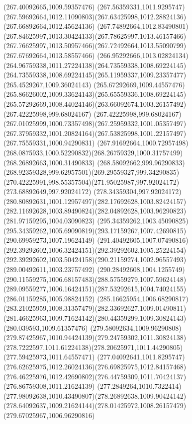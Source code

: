 {{\lineto(267.40092665,1009.59357476)
\lineto(267.56359331,1011.9295747)
\curveto(267.59692664,1012.11090803)(267.63425998,1012.28824136)(267.66892664,1012.45624136)
\curveto(267.74892664,1012.83490801)(267.84625997,1013.30424133)(267.78625997,1013.46157466)
\curveto(267.76625997,1013.50957466)(267.72492664,1013.55090799)(267.67692664,1013.58557466)
\curveto(266.95292666,1013.02824134)(264.96759338,1011.27224138)(264.73559338,1008.69224145)
\curveto(264.73559338,1008.69224145)(265.11959337,1009.23357477)(265.4529267,1009.36024143)
\curveto(265.67292669,1009.44557476)(265.86626002,1009.33624143)(265.65559336,1008.69224145)
\curveto(265.57292669,1008.44024146)(263.66092674,1003.26157492)(267.42225998,999.68024167)
\curveto(267.42225998,999.68024167)(267.01025999,1000.73357498)(267.25959332,1001.05357497)
\curveto(267.37959332,1001.20824164)(267.53825998,1001.22157497)(267.75559331,1000.94290831)
\curveto(267.91692664,1000.72957498)(268.0875933,1000.52290832)(268.26759329,1000.31757499)
\lineto(268.26892663,1000.31490833)
\curveto(268.58092662,999.96290833)(268.92359328,999.62957501)(269.29559327,999.34290835)
\curveto(270.42225991,998.55357504)(271.95025987,997.92024172)(273.68892649,997.92024172)
\curveto(278.34359304,997.92024172)(280.80892631,1001.12957497)(282.17692628,1003.82424157)
\curveto(282.11692628,1003.89490824)(282.04892628,1003.96290823)(281.97159295,1004.03090823)
\moveto(295.34359262,1003.45090825)
\curveto(295.34359262,1005.69090819)(293.17159267,1007.42690815)(290.69959273,1007.19624149)
\curveto(291.40492605,1007.07490816)(292.39292602,1006.32424151)(292.39292602,1005.25224154)
\curveto(292.39292602,1003.50424158)(290.21159274,1002.96557493)(289.00492611,1003.23757492)
\curveto(290.28492608,1004.1255749)(290.11559275,1006.68157483)(288.57559279,1007.59624148)
\curveto(289.09559277,1006.16424151)(287.53292615,1004.74024155)(286.01159285,1005.98824152)
\curveto(285.16625954,1006.68290817)(283.21025959,1008.31357479)(282.33692627,1009.01490811)
\curveto(281.46625963,1009.71624142)(280.44359299,1009.30824143)(280.039593,1009.61357476)
\curveto(279.58092634,1009.96290808)(279.87425967,1010.94424139)(279.24759302,1011.30824138)
\curveto(278.7222597,1011.61224138)(278.20625971,1011.44290805)(277.59425973,1011.64557471)
\curveto(277.04092641,1011.8295747)(276.62625975,1012.26024136)(276.69825975,1012.84157468)
\curveto(276.46225976,1012.42690802)(276.44759309,1011.70424137)(276.86759308,1011.21624139)
\curveto(277.2849264,1010.7322414)(277.98092638,1010.43490807)(278.26892638,1009.90424142)
\curveto(278.64092637,1009.21624144)(278.01425972,1008.26157479)(279.67025967,1006.96290816)
}}
